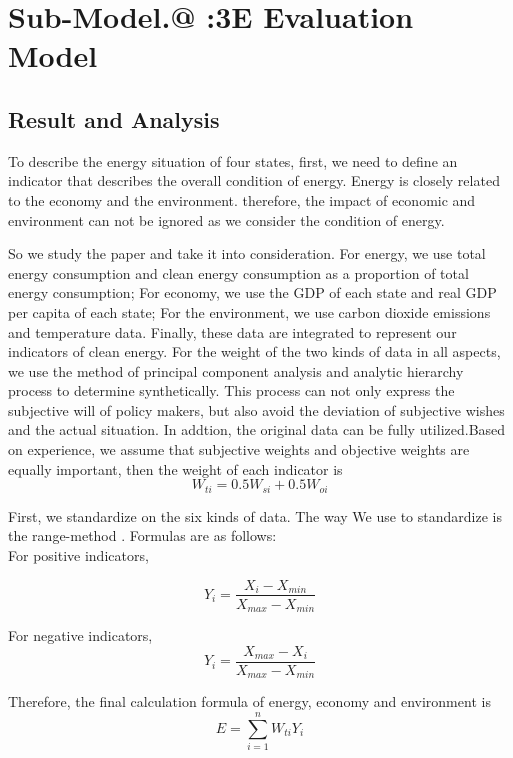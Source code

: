 \documentclass{mcmthesis}
\makeatletter
\newcommand{\Rmnum}[1]{\expandafter\@slowromancap\romannumeral #1@}
\makeatother
\begin{document}
\section{Sub-Model.\Rmnum{1} :\quad 3E Evaluation Model}
\subsection{Result and Analysis}
To describe the energy situation of four states, first, we need to define an indicator that describes the overall condition of energy. Energy is closely related to the economy and the environment. therefore, the impact of economic and environment can not be ignored as we consider the condition of energy.

So we study the paper \cite{zhaotao2008energy} and take it into consideration. For energy, we use total energy consumption and clean energy consumption as a proportion of total energy consumption; For economy, we use the GDP of each state and real GDP per capita of each state; For the environment, we use carbon dioxide emissions and temperature data. Finally, these data are integrated to represent our indicators of clean energy.
For the weight of the two kinds of data in all aspects, we use the method of principal component analysis and analytic hierarchy process to determine synthetically. This process can not only express the subjective will of policy makers, but also avoid the deviation of subjective wishes and the actual situation. In addtion, the original data can be fully utilized.Based on experience, we assume that subjective weights and objective weights are equally important, then the weight of each  indicator is
\begin{equation}
  W_{ti} = 0.5 W_{si} + 0.5 W_{oi} 
\end{equation}

First, we standardize on the six kinds of data. The way We use to standardize is the range-method . Formulas are as follows:\\

For positive indicators,

\begin{equation}
  Y_i = \frac{X_i - X_{min}}{X_{max} - X_{min}}
\end{equation}

For negative indicators,
\begin{equation}
  Y_i = \frac{X_{max} - X_i}{X_{max} - X_{min}}
\end{equation}

Therefore, the final calculation formula of energy, economy and environment is 
\begin{equation}
  E = \sum_{i=1}^{n} W_{ti} Y_{i} 
\end{equation}
\end{document}
